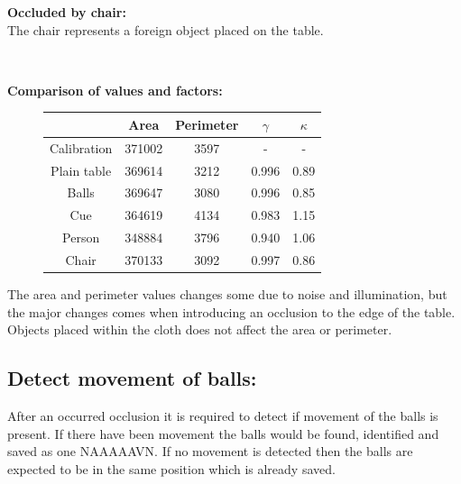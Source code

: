 \textbf{Occluded by chair:}\\
The chair represents a foreign object placed on the table.
\begin{figure}[H]
\centering
{}
\\
\end{figure}

\textbf{Comparison of values and factors:}

\begin{figure}[H]
\centering
\begin{tabular}{|c|c|c|c|c|}
\hline  & Area & Perimeter & $\gamma$ & $\kappa$ \\ 
\hline Calibration & 371002 & 3597 & - & - \\ 
\hline Plain table & 369614 & 3212 & 0.996 & 0.89 \\
\hline Balls & 369647 & 3080 & 0.996 & 0.85  \\ 
\hline Cue & 364619 & 4134 & 0.983 & 1.15 \\ 
\hline Person & 348884 & 3796 & 0.940 & 1.06 \\ 
\hline Chair & 370133 & 3092 & 0.997 & 0.86 \\ 
\hline 
\end{tabular} 
\end{figure}

The area and perimeter values changes some due to noise and illumination, but the major changes comes when introducing an occlusion to the edge of the table. Objects placed within the cloth does not affect the area or perimeter.

\subsection{Detect movement of balls:}
After an occurred occlusion it is required to detect if movement of the balls is present. If there have been movement the balls would be found, identified and saved as one NAAAAAVN. If no movement is detected then the balls are expected to be in the same position which is already saved.\\

